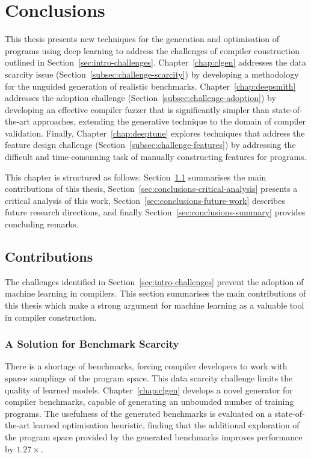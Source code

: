 \chapter{Conclusions}
\label{chap:conclusions}

This thesis presents new techniques for the generation and optimisation of programs using deep learning to address the challenges of compiler construction outlined in Section~\ref{sec:intro-challenges}. Chapter~\ref{chap:clgen} addresses the data scarcity issue (Section~\ref{subsec:challenge-scarcity}) by developing a methodology for the unguided generation of realistic benchmarks. Chapter~\ref{chap:deepsmith} addresses the adoption challenge (Section~\ref{subsec:challenge-adoption}) by developing an effective compiler fuzzer that is significantly simpler than state-of-the-art approaches, extending the generative technique to the domain of compiler validation. Finally, Chapter~\ref{chap:deeptune} explores techniques that address the feature design challenge (Section~\ref{subsec:challenge-features}) by addressing the difficult and time-consuming task of manually constructing features for programs.

This chapter is structured as follows: Section~\ref{sec:conclusions-contributions} summarises the main contributions of this thesis, Section~\ref{sec:conclusions-critical-analysis} presents a critical analysis of this work, Section~\ref{sec:conclusions-future-work} describes future research directions, and finally Section~\ref{sec:conclusions-summary} provides concluding \linebreak remarks.


\section{Contributions}
\label{sec:conclusions-contributions}

The challenges identified in Section~\ref{sec:intro-challenges} prevent the adoption of machine learning in compilers. This section summarises the main contributions of this thesis which make a strong argument for machine learning as a valuable tool in compiler construction.


\subsection{A Solution for Benchmark Scarcity}

There is a shortage of benchmarks, forcing compiler developers to work with sparse samplings of the program space. This data scarcity challenge limits the quality of learned models. Chapter~\ref{chap:clgen} develops a novel generator for compiler benchmarks, capable of generating an unbounded number of training programs. The usefulness of the generated benchmarks is evaluated on a state-of-the-art learned optimisation heuristic, finding that the additional exploration of the program space provided by the generated benchmarks improves performance by $1.27\times$.

